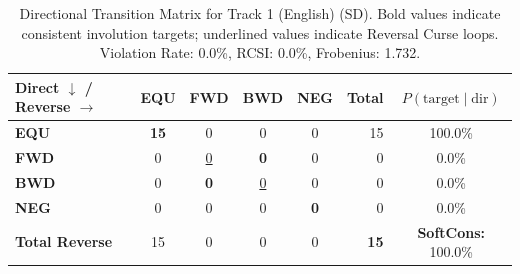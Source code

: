 \begin{table}[ht]
\centering
\small
\begin{tabular}{l|cccc|r|c}
\toprule
\textbf{Direct $\downarrow$ / Reverse $\rightarrow$} & \textbf{EQU} & \textbf{FWD} & \textbf{BWD} & \textbf{NEG} & \textbf{Total} & \textbf{$P(\text{target} \mid \text{dir})$} \\
\midrule
\textbf{EQU} & \textbf{15} & 0 & 0 & 0 & 15 & 100.0\% \\
\textbf{FWD} & 0 & \underline{0} & \textbf{0} & 0 & 0 & 0.0\% \\
\textbf{BWD} & 0 & \textbf{0} & \underline{0} & 0 & 0 & 0.0\% \\
\textbf{NEG} & 0 & 0 & 0 & \textbf{0} & 0 & 0.0\% \\
\midrule
\textbf{Total Reverse} & 15 & 0 & 0 & 0 & \textbf{15} & \textbf{SoftCons:} 100.0\% \\
\bottomrule
\end{tabular}
\caption{Directional Transition Matrix for Track 1 (English) (SD). Bold values indicate consistent involution targets; underlined values indicate Reversal Curse loops. Violation Rate: 0.0\%, RCSI: 0.0\%, Frobenius: 1.732.}
\label{tab:transition_matrix}
\end{table}